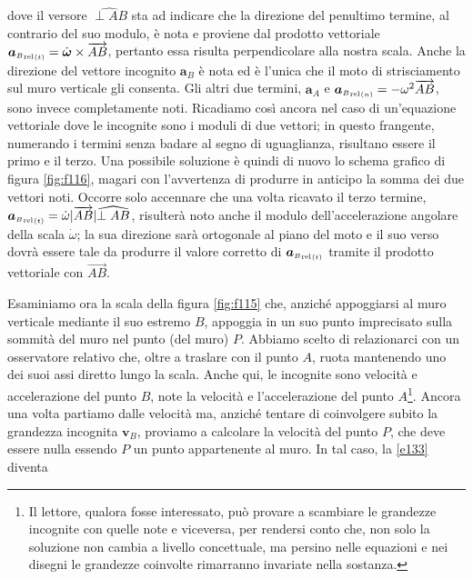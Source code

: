 \noindent dove il versore
$\widehat{{\perp{AB}}}$ sta ad indicare che la direzione del penultimo termine, al contrario del suo
modulo, \`e nota e proviene dal prodotto vettoriale
${{{\bm a}_{\scriptscriptstyle{B}}}_{\scriptscriptstyle{{\rm rel}}}}_{\scriptscriptstyle{(t)}}=
\dot{\bm\omega}\times\overrightarrow{AB}$,
pertanto essa risulta perpendicolare alla nostra scala.
Anche la direzione del vettore incognito ${{\bm a}_{\scriptscriptstyle{B}}}$
\`e nota ed \`e l'unica che il moto di strisciamento sul
muro verticale gli consenta.
Gli altri due termini, ${{\bm a}_{\scriptscriptstyle{A}}}$ e
${{{\bm a}_{\scriptscriptstyle{B}}}_{\scriptscriptstyle{{\rm rel}}}}_{\scriptscriptstyle{(n)}}=-\omega^2 \overrightarrow{AB}$, sono
invece completamente noti.
Ricadiamo cos\`i ancora nel caso di un'equazione vettoriale dove le incognite sono i moduli di due vettori; in questo frangente,
numerando i termini senza badare al segno di uguaglianza, risultano essere il primo e il terzo.
Una possibile soluzione \`e quindi di nuovo
lo schema grafico di figura \ref{fig:f116}, magari con l'avvertenza di produrre in
anticipo la somma dei due vettori noti. 
Occorre solo accennare che una volta ricavato
il terzo termine, 
${{{\bm a}_{\scriptscriptstyle{B}}}_{\scriptscriptstyle{{\rm rel}}}}_{\scriptscriptstyle{(t)}}=
\dot{\omega}|\overrightarrow{AB}|\widehat{{\perp{AB}}}$, risulter\`a noto anche
il modulo  dell'accelerazione 
angolare della scala $\dot{\omega}$; la sua direzione sar\`a ortogonale
al piano del moto e il suo verso dovr\`a
essere tale da produrre il
valore corretto di 
${{{\bm a}_{\scriptscriptstyle{B}}}_{\scriptscriptstyle{{\rm rel}}}}_{\scriptscriptstyle{(t)}}$
tramite il prodotto vettoriale con $\overrightarrow{AB}$.


\noindent Esaminiamo ora la scala della figura \ref{fig:f115} che, anzich\'e appoggiarsi al muro verticale
mediante il suo estremo $B$, appoggia in un suo punto imprecisato sulla sommit\`a del muro nel
punto (del muro) $P$. Abbiamo scelto di relazionarci con un osservatore relativo
che, oltre a traslare con il punto $A$, ruota mantenendo uno dei suoi assi diretto
lungo la scala.
Anche qui, le incognite sono velocit\`a e accelerazione del punto $B$, note la velocit\`a
e l'accelerazione del punto $A$\footnote
{
Il lettore, qualora fosse interessato, pu\`o provare
a scambiare le grandezze incognite con quelle note e viceversa, per rendersi
conto che, non solo la soluzione non cambia a livello concettuale, ma persino
nelle equazioni e nei disegni le grandezze coinvolte
rimarranno invariate nella sostanza.
}.
Ancora una volta partiamo dalle velocit\`a ma, anzich\'e tentare di coinvolgere subito
la grandezza incognita  
${{\bm v}_{\scriptscriptstyle{B}}}$,
proviamo a calcolare la velocit\`a del punto $P$, che deve essere nulla essendo
$P$ un punto appartenente al muro.
In tal caso, la \ref{e133} diventa

